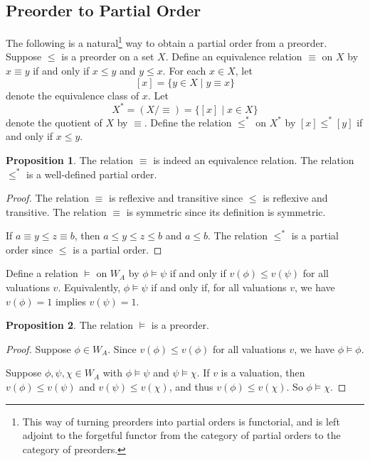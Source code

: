 \documentclass[12pt]{article}
\theoremstyle{definition}
\newtheorem*{proposition}{\color{blue} Proposition}
\begin{document}
\begin{multicols*}{2}
\section*{Preorder to Partial Order}

The following is a natural\footnote{This way of turning preorders into partial orders is functorial, and is left adjoint to the forgetful functor from the category of partial orders to the category of preorders.} way to obtain a partial order from a preorder. Suppose $\leq$ is a preorder on a set $X$. Define an equivalence relation $\equiv$ on $X$ by $x\equiv y$ if and only if $x\leq y$ and $y\leq x$. For each $x\in X$, let
\[
[x] = \{y\in X \mid y\equiv x\}
\]
denote the equivalence class of $x$. Let
\[
X^\ast = (X/\equiv) = \{[x]\mid x\in X\}
\]
denote the quotient of $X$ by $\equiv$. Define the relation $\leq^\ast$ on $X^\ast$ by $[x]\leq^\ast[y]$ if and only if $x\leq y$.%
\begin{proposition}
	The relation $\equiv$ is indeed an equivalence relation. The relation $\leq^\ast$ is a well-defined partial order.
\end{proposition}
\begin{proof}
	The relation $\equiv$ is reflexive and transitive since $\leq$ is reflexive and transitive. The relation $\equiv$ is symmetric since its definition is symmetric.
	
	If $a\equiv y\leq z\equiv b$, then $a\leq y\leq z\leq b$ and $a\leq b$. The relation $\leq^\ast$ is a partial order since $\leq$ is a partial order.
\end{proof}

Define a relation $\vDash$ on $W_A$ by $\phi\vDash\psi$ if and only if $v(\phi)\leq v(\psi)$ for all valuations $v$. Equivalently, $\phi\vDash\psi$ if and only if, for all valuations $v$, we have $v(\phi)=1$ implies $v(\psi)=1$.

\begin{proposition}
	The relation $\vDash$ is a preorder.
\end{proposition}
\begin{proof}
	Suppose $\phi\in W_A$. Since $v(\phi)\leq v(\phi)$ for all valuations $v$, we have $\phi\vDash\phi$.
	
	Suppose $\phi,\psi,\chi\in W_A$ with $\phi\vDash\psi$ and $\psi\vDash\chi$. If $v$ is a valuation, then $v(\phi)\leq v(\psi)$ and $v(\psi)\leq v(\chi)$, and thus $v(\phi)\leq v(\chi)$. So $\phi\vDash\chi$.
\end{proof}


\end{multicols*}
\end{document}
